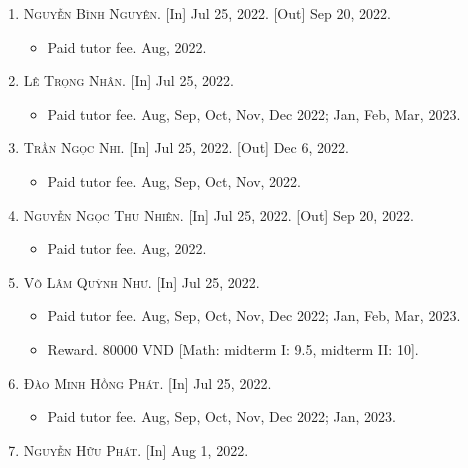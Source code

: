 \documentclass{article}
\begin{document}
\begin{enumerate}
\begin{itemize}
		\item \textsf{Reward.} 1-euro coin $+$ 100000 VND [Math: midterm I: 9.5, final term I: 9, midterm II: 9.8].
		\item \textsf{Score.} \href{https://github.com/NQBH/hobby/blob/master/STEM/student/Nguyen_Nhu_Ngoc_grade_6_1st_semester.jpg}{NNN's 1st semester}.\footnote{The abbreviation of her name should not be confused with No Nut November.}
	\end{itemize}
	\item \textsc{Nguyễn Bình Nguyên.} \textsf{[In]} Jul 25, 2022. \textsf{[Out]} Sep 20, 2022.
	\begin{itemize}
		\item \textsf{Paid tutor fee.} Aug, 2022.
	\end{itemize}
	\item \textsc{Lê Trọng Nhân.} \textsf{[In]} Jul 25, 2022.
	\begin{itemize}
		\item \textsf{Paid tutor fee.} Aug, Sep, Oct, Nov, Dec 2022; Jan, Feb, Mar, 2023.
	\end{itemize}
	\item \textsc{Trần Ngọc Nhi.} \textsf{[In]} Jul 25, 2022. \textsf{[Out]} Dec 6, 2022.
	\begin{itemize}
		\item \textsf{Paid tutor fee.} Aug, Sep, Oct, Nov, 2022.
	\end{itemize}
	\item \textsc{Nguyễn Ngọc Thu Nhiên.} \textsf{[In]} Jul 25, 2022. \textsf{[Out]} Sep 20, 2022.
	\begin{itemize}
		\item \textsf{Paid tutor fee.} Aug, 2022.
	\end{itemize}
	\item \textsc{Võ Lâm Quỳnh Như.} \textsf{[In]} Jul 25, 2022.
	\begin{itemize}
		\item \textsf{Paid tutor fee.} Aug, Sep, Oct, Nov, Dec 2022; Jan, Feb, Mar, 2023.
		\item \textsf{Reward.} 80000 VND [Math: midterm I: 9.5, midterm II: 10].
	\end{itemize}
	\item \textsc{Đào Minh Hồng Phát.} \textsf{[In]} Jul 25, 2022.
	\begin{itemize}
		\item \textsf{Paid tutor fee.} Aug, Sep, Oct, Nov, Dec 2022; Jan, 2023.
	\end{itemize}
	\item \textsc{Nguyễn Hữu Phát.} \textsf{[In]} Aug 1, 2022.

\end{enumerate}
\end{document}
